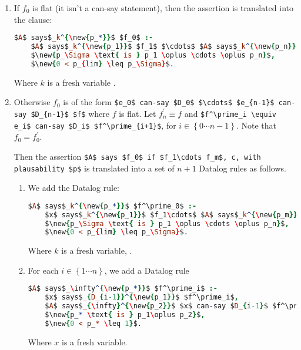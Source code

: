 \documentclass[a4paper]{scrartcl}
\begin{document}
\begin{enumerate}
\item 
  If $f_0$ is flat (it isn't a can-say statement), then the assertion is translated into the clause:
  \begin{lstlisting}[language=Prolog]
$A$ says$_k^{\new{p_*}}$ $f_0$ :- 
    $A$ says$_k^{\new{p_1}}$ $f_1$ $\cdots$ $A$ says$_k^{\new{p_n}}$ $f_n$, c, 
    $\new{p_\Sigma \text{ is } p_1 \oplus \cdots \oplus p_n}$, 
    $\new{0 < p_{lim} \leq p_\Sigma}$.
  \end{lstlisting}
  Where $k$ is a fresh variable .
  
\item 
  Otherwise $f_0$ is of the form \lstinline!$e_0$ can-say $D_0$ $\cdots$ $e_{n-1}$ can-say $D_{n-1}$ $f$! where $f$ is flat.
  Let $f^\prime_n \equiv f$ and \lstinline!$f^\prime_i \equiv e_i$ can-say $D_i$ $f^\prime_{i+1}$!, for $i\in\left\{0\cdots n-1\right\}$.
  Note that $f_0 = f^\prime_0$.  

  Then the assertion \lstinline!$A$ says $f_0$ if $f_1\cdots f_m$, c, with plausability $p$! is translated into a set of $n+1$ Datalog rules as follows.
  
  \begin{enumerate}
  \item 
    We add the Datalog rule:
    \begin{lstlisting}[language=Prolog]
$A$ says$_k^{\new{p_*}}$ $f^\prime_0$ :-
    $x$ says$_k^{\new{p_1}}$ $f_1\cdots$ $A$ says$_k^{\new{p_m}}$ $f_m$, c,
    $\new{p_\Sigma \text{ is } p_1 \oplus \cdots \oplus p_n}$, 
    $\new{0 < p_{lim} \leq p_\Sigma}$.
    \end{lstlisting}
    Where $k$ is a fresh variable, .

  \item
    For each $i\in\left\{1\cdots n\right\}$, we add a Datalog rule
    \begin{lstlisting}[language=Prolog]
$A$ says$_\infty^{\new{p_*}}$ $f^\prime_i$ :-
    $x$ says$_{D_{i-1}}^{\new{p_1}}$ $f^\prime_i$,
    $A$ says$_{\infty}^{\new{p_2}}$ $x$ can-say $D_{i-1}$ $f^\prime_i$,
    $\new{p_* \text{ is } p_1\oplus p_2}$, 
    $\new{0 < p_* \leq 1}$.
    \end{lstlisting}
    Where $x$ is a fresh variable.
  \end{enumerate}
  

\end{enumerate}
\end{document}
